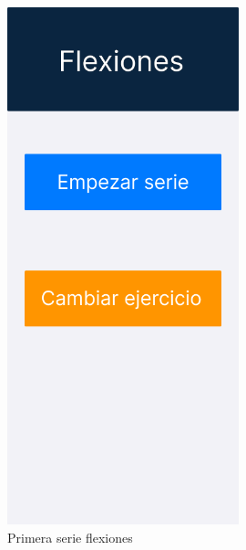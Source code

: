 \begin{figure}[H]
   \centering
    \includegraphics[width=0.6\textwidth]{fotos/Frame 2.png}
    \caption{Primera serie flexiones}
    \label{fig:Primera serie flexiones}
\end{figure}
